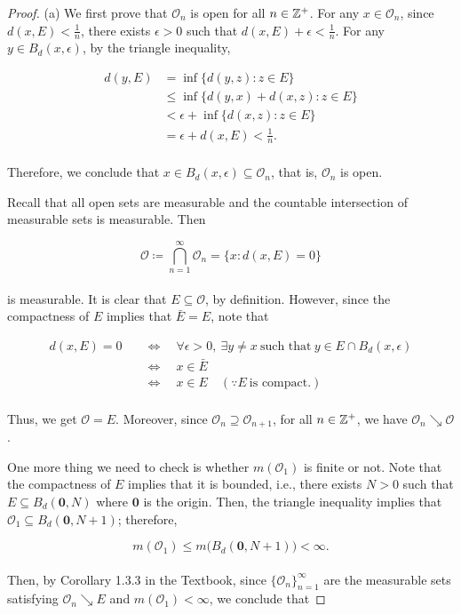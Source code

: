 \documentclass[12pt, a4paper, openany, twoside]{book}
\theoremstyle{definition}
\theoremstyle{remark}
\theoremstyle{plain}
\numberwithin{equation}{section}
\begin{document}
\begin{proof}
    (a) We first prove that $\mathcal{O}_n$ is open for all $n\in{\mathbb {Z}}^+$. For any $x\in\mathcal{O}_n$, since $d(x,E)<\frac{1}{n}$, there exists $\epsilon>0$ such that $d(x,E)+ \epsilon<\frac{1}{n}$. For any $y\in B_d(x,\epsilon)$, by the triangle inequality,

    \begin{align*}
        d(y,E) &= \inf\{d(y,z):z\in E\}\\
        &\leq\inf\{d(y,x)+d(x,z):z\in E\}\\
        &<\epsilon + \inf\{d(x,z):z\in E\}\\
        &=\epsilon+d(x,E)<\frac{1}{n}.
    \end{align*}
    \\
    Therefore, we conclude that $x\in B_d(x,\epsilon)\subseteq\mathcal{O}_n$, that is, $\mathcal{O}_n$ is open.

    Recall that all open sets are measurable and the countable intersection of measurable sets is measurable. Then

    \[\mathcal{O}\coloneqq\bigcap_{n=1}^{\infty}{\mathcal{O}_n}=\{x:d(x,E)=0\}\]
    \\
    is measurable. It is clear that $E\subseteq\mathcal{O}$, by definition. However, since the compactness of $E$ implies that $\bar{E}=E$, note that

    \begin{align*}
        d(x,E)=0\quad&\Longleftrightarrow\quad\forall\epsilon>0,\ \exists y\neq x\ \text{such that}\ y\in E\cap B_d(x,\epsilon)\\
        &\Longleftrightarrow\quad x\in\bar{E}\\
        &\Longleftrightarrow\quad x\in E\quad(\because E\ \text{is compact}.)
    \end{align*}
    \\
    Thus, we get $\mathcal{O}=E$. Moreover, since $\mathcal{O}_n\supseteq\mathcal{O}_{n+1}$, for all $n\in{\mathbb {Z}}^+$, we have $\mathcal{O}_n\searrow\mathcal{O}$. 

    One more thing we need to check is whether $m(\mathcal{O}_1)$ is finite or not. Note that the compactness of $E$ implies that it is bounded, i.e., there exists $N>0$ such that $E\subseteq B_d(\mathbf{0},N)$ where $\mathbf{0}$ is the origin. Then, the triangle inequality implies that $\mathcal{O}_1\subseteq B_d(\mathbf{0},N+1)$; therefore, 
    
    \[m(\mathcal{O}_1)\leq m\big(B_d(\mathbf{0},N+1)\big)<\infty.\]
    \\
    Then, by Corollary 1.3.3 in the Textbook, since $\{\mathcal{O}_n\}_{n=1}^{\infty}$ are the measurable sets satisfying $\mathcal{O}_n\searrow E$ and $m(\mathcal{O}_1)<\infty$, we conclude that 


\end{proof}
\end{document}
